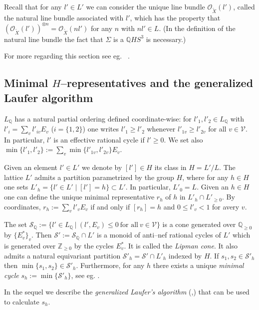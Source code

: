 \documentclass[12pt,a4paper]{amsart}
\def\cS{{\mathcal S}}
\def\V{{\mathcal V}}
\def\Q{\mathbb{Q}}
\def\QQ{\mathbb{Q}}
\theoremstyle{remark}
\theoremstyle{definition}
\begin{document}
Recall that for any $l'\in L'$ we can consider the unique line bundle ${\mathcal O}_{\tilde{X}}(l')$,
called the natural line bundle associated with $l'$, which has the property that 
$({\mathcal O}_{\tilde{X}}(l'))^{\otimes n}= {\mathcal O}_{\tilde{X}}(nl')$ for any 
$n$  with $nl'\in L$. (In the definition of the natural line bundle the fact that $\Sigma$ is a 
$\Q HS^3$ is necessary.)

\vspace{0.3cm}

For more regarding this section see eg. ~\cite{nbook}.

\subsection{Minimal \texorpdfstring{$H$}{H}--representatives and the generalized Laufer algorithm}\label{ss:HrepLip}
$L_{\QQ}$ has  a natural partial ordering defined coordinate-wise: 
for $l'_1,l'_2\in L_\QQ$ with $l'_i=\sum_v l'_{iv}E_v$ ($i=\{1,2\}$) one 
writes $l'_1\geq l'_2$  whenever  $l'_{1v}\geq l'_{2v}$ for all $v\in\V$. 
In particular, $l'$ is an effective rational cycle if $l'\geq 0$. We set also $\min\{l'_1,l'_2\}:= \sum_v\min\{l'_{1v},l'_{2v}\}E_v$.

Given an element $l'\in L'$ we denote by $[l']\in H$ its class in $H=L'/L$.
The lattice $L'$ admits a partition parametrized by the group $H$,  where for any $h\in H$ one sets 
$L'_h=\{l'\in L'\mid [l']=h\}\subset L'$. In particular, $L'_0=L$.
Given an $h\in H$ one can define the unique minimal representative $r_h$ of $h$ in 
$L'_h\cap L'_{\geq 0}$. By coordinates,    $r_h:=\sum_v l'_v E_v$ if and only if $[r_h]=h$   and 
$0\leq l'_v<1$ for avery $v$.

The set $\cS_\QQ:=\{l'\in L_\QQ \ | \ (l',E_v)\leq 0 \ \mbox{for all} \ v\in \V\}$ 
is a cone generated over $\QQ_{\geq 0}$ by $\{E^*_v\}_v$. Then $\cS':=\cS_\QQ\cap L'$ is a monoid of anti--nef rational cycles of $L'$ which is generated over $\mathbb{Z}_{\geq 0}$ by the cycles $E^*_v$. It is called the \emph{Lipman cone}. 
It  also admits a natural equivariant partition $\cS'_{h}=\cS'\cap L'_h$ indexed  by $H$. If $s_1,s_2\in \cS'_{h}$ then $\min\{s_1,s_2\}\in \cS'_h$. Furthermore, for any $h$ there exists a unique  \emph{minimal cycle} $s_h:=\min \{\cS'_{h}\}$, see eg. \cite{NemOSZ}. 

In the sequel we  describe the  \emph{generalized Laufer's algorithm} (\cite[Lemma 7.4]{NemOSZ},\cite{Laufer-rational}) that can be used to calculate $s_h$.
\end{document}
